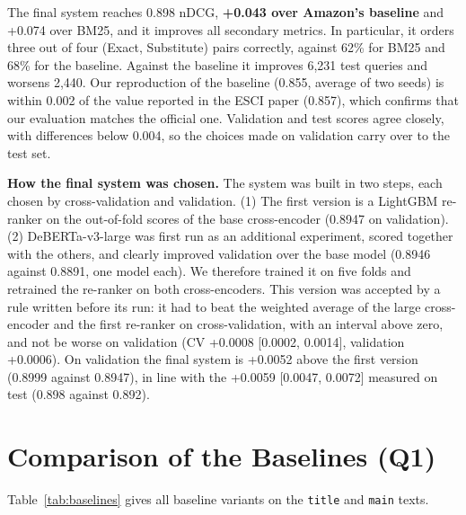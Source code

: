 \documentclass[12pt,a4paper]{report}
\begin{document}
The final system reaches 0.898 nDCG, \textbf{+0.043 over Amazon's baseline} and +0.074 over BM25, and it improves all secondary metrics. In particular, it orders three out of four (Exact, Substitute) pairs correctly, against 62\% for BM25 and 68\% for the baseline. Against the baseline it improves 6,231 test queries and worsens 2,440. Our reproduction of the baseline (0.855, average of two seeds) is within 0.002 of the value reported in the ESCI paper (0.857), which confirms that our evaluation matches the official one. Validation and test scores agree closely, with differences below 0.004, so the choices made on validation carry over to the test set.

\textbf{How the final system was chosen.} The system was built in two steps, each chosen by cross-validation and validation.
(1) The first version is a LightGBM re-ranker on the out-of-fold scores of the base cross-encoder (0.8947 on validation).
(2) DeBERTa-v3-large was first run as an additional experiment, scored together with the others, and clearly improved validation over the base model (0.8946 against 0.8891, one model each).
We therefore trained it on five folds and retrained the re-ranker on both cross-encoders. This version was accepted by a rule written before its run: it had to beat the weighted average of the large cross-encoder and the first re-ranker on cross-validation, with an interval above zero, and not be worse on validation (CV +0.0008 [0.0002, 0.0014], validation +0.0006).
On validation the final system is +0.0052 above the first version (0.8999 against 0.8947), in line with the +0.0059 [0.0047, 0.0072] measured on test (0.898 against 0.892).

\section{Comparison of the Baselines (Q1)}\label{sec:q1}
Table~\ref{tab:baselines} gives all baseline variants on the \texttt{title} and \texttt{main} texts.
\end{document}
